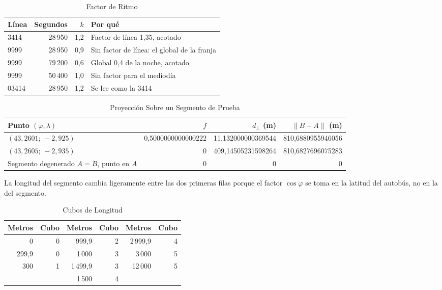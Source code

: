 \begin{table}[ht]
\centering
\caption{Factor de Ritmo}\label{tab:v-k}
\begin{tabular}{@{}lrrl@{}}
\toprule
Línea & Segundos & $k$ & Por qué\\
\midrule
3414 & 28\,950 & 1,2 & Factor de línea 1,35, acotado\\
9999 & 28\,950 & 0,9 & Sin factor de línea: el global de la franja\\
9999 & 79\,200 & 0,6 & Global 0,4 de la noche, acotado\\
9999 & 50\,400 & 1,0 & Sin factor para el mediodía\\
03414 & 28\,950 & 1,2 & Se lee como la 3414\\
\bottomrule
\end{tabular}
\end{table}

\begin{table}[ht]
\centering
\caption{Proyección Sobre un Segmento de Prueba}\label{tab:v-proyeccion}
\begin{tabular}{@{}>{\raggedright\arraybackslash}p{}rrr@{}}
\toprule
Punto $(\varphi,\lambda)$ & $f$ & $d_\perp$ (m) & $\|B-A\|$ (m)\\
\midrule
$(43{,}2601;\,-2{,}925)$ & 0,5000000000000222 & 11,132000000369544 & 810,6880955946056\\
$(43{,}2605;\,-2{,}935)$ & 0 & 409,14505231598264 & 810,6827696075283\\
Segmento degenerado $A=B$, punto en $A$ & 0 & 0 & 0\\
\bottomrule
\end{tabular}
\end{table}

\noindent La longitud del segmento cambia ligeramente entre las dos primeras filas porque el factor
$\cos\varphi$ se toma en la latitud del autobús, no en la del segmento.

\begin{table}[ht]
\centering
\caption{Cubos de Longitud}\label{tab:v-cubo}
\begin{tabular}{@{}rr@{\qquad}rr@{\qquad}rr@{}}
\toprule
Metros & Cubo & Metros & Cubo & Metros & Cubo\\
\midrule
0 & 0 & 999,9 & 2 & 2\,999,9 & 4\\
299,9 & 0 & 1\,000 & 3 & 3\,000 & 5\\
300 & 1 & 1\,499,9 & 3 & 12\,000 & 5\\
& & 1\,500 & 4 & &\\
\bottomrule
\end{tabular}
\end{table}

